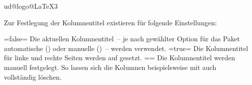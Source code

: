 \newcommand*\tud@logo@LaTeXe{%
  \tud@logo@LaTeX\kern.1\tud@logo@w%
  \hbox{%
    \m@th%
    \if b\expandafter\@car\f@series x\@nil\csname boldmath\endcsname\fi%
    2$_{\textstyle\varepsilon}$%
  }\@%
}
\expandafter\newcommand\expandafter*\csname tud@logo@LaTeX3
\newcommand*\tud@logo@pdfLaTeX{%
  \tud@logo@scale{x}{PDF}\tud@logo@LaTeX%
}
\newcommand*\tud@logo@LuaLaTeX{%
  L\tud@logo@scale{x}{UA}\tud@logo@LaTeX%
}
\newcommand*\tud@logo@XeLaTeX{%
  \tud@logo@Xe%
  \kern-.15\tud@logo@w\tud@logo@ic{\kern.015\tud@logo@w}%
  \tud@logo@LaTeX%
}
\newcommand*\tud@logo@BibTeX{%
  B\tud@logo@scale{x}{IB}\kern-.1\tud@logo@w\tud@logo@TeX%
}
\newcommand*\tud@logo@MiKTeX{MiK\kern.05\tud@logo@w\tud@logo@TeX}
\newcommand*\tud@logo@LyX{%
  L\kern-.12\tud@logo@w\tud@logo@ic{\kern-.03\tud@logo@w}%
  \lower.5\tud@logo@h\hbox{Y}%
  \kern-.12\tud@logo@w\tud@logo@ic{\kern.07\tud@logo@w}%
  X\@%
}

\def\do#1{%
\clearpage
\par\noindent\sanslogo{#1}
\par\noindent\textsf{\sanslogo{#1}}
\par\noindent\textit{\sanslogo{#1}}
\par\noindent\textsl{\sanslogo{#1}}
\par\noindent\textbf{\sanslogo{#1}}
\par\noindent\textbf{\textsl{\sanslogo{#1}}}
}




\begin{Declaration}
  {}
\begin{Declaration}
  {}
\printdeclarationlist
Zur Festlegung der Kolumnentitel existieren für 
folgende Einstellungen:%
\begin{DeclareValues}
\itemval=false=
  Die aktuellen Kolumnentitel~-- je nach gewählter Option für das Paket 
   automatische () oder manuelle 
  ()~-- werden verwendet.
\itemval*=true=
  Die Kolumnentitel für linke und rechte Seiten werden auf  
  gesetzt.
\itemval==
  Die Kolumnentitel werden manuell festgelegt. So lassen sich die Kolumnen 
  beispielsweise mit  auch 
  vollständig löschen. 
\end{DeclareValues}
\end{Declaration}
\end{Declaration}


